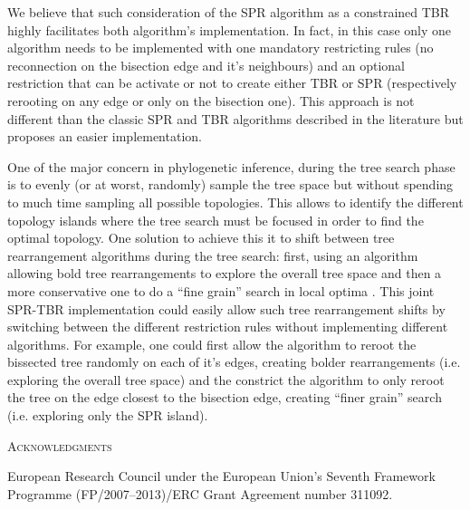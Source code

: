 \documentclass[12pt,letterpaper]{article}
\renewcommand{\section}[1]{%
\bigskip
\begin{center}
\begin{Large}
\normalfont\scshape #1
\medskip
\end{Large}
\end{center}}
\begin{document}
We believe that such consideration of the SPR algorithm as a constrained TBR highly facilitates both algorithm's implementation.
In fact, in this case only one algorithm needs to be implemented with one mandatory restricting rules (no reconnection on the bisection edge and it's neighbours) and an optional restriction that can be activate or not to create either TBR or SPR (respectively rerooting on any edge or only on the bisection one).
This approach is not different than the classic SPR and TBR algorithms described in the literature \citep{allen2001subtree,felsenstein2004inferring} but proposes an easier implementation.

One of the major concern in phylogenetic inference, during the tree search phase is to evenly (or at worst, randomly) sample the tree space but without spending to much time sampling all possible topologies.
This allows to identify the different topology islands where the tree search must be focused in order to find the optimal topology.
One solution to achieve this it to shift between tree rearrangement algorithms during the tree search: first, using an algorithm allowing bold tree rearrangements to explore the overall tree space and then a more conservative one to do a ``fine grain'' search in local optima \citep{lakner2008efficiency}.
This joint SPR-TBR implementation could easily allow such tree rearrangement shifts by switching between the different restriction rules without implementing different algorithms.
For example, one could first allow the algorithm to reroot the bissected tree randomly on each of it's edges, creating bolder rearrangements (i.e. exploring the overall tree space) and the constrict the algorithm to only reroot the tree on the edge closest to the bisection edge, creating ``finer grain'' search (i.e. exploring only the SPR island).


\section{Acknowledgments}
European Research Council under the European Union’s Seventh Framework Programme (FP/2007–2013)/ERC Grant Agreement number 311092.




\end{document}
